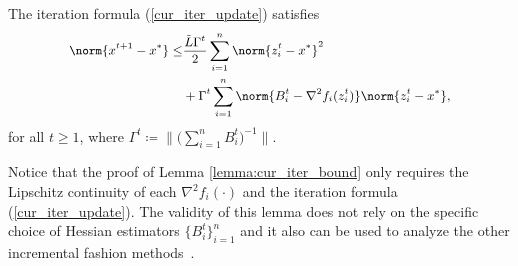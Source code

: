 \begin{lemma}\label{lemma:cur_iter_bound}
    The iteration formula (\ref{cur_iter_update}) satisfies
    \begin{equation}
    \small
    \begin{split}
        \norm{x^{t+1} - x^*} \leq& \frac{\Tilde{L} \Gamma^{t}}{2} \sum_{i=1}^n \norm{z_i^{t} - x^*}^2  \\
        & + \Gamma^{t} \sum_{i=1}^n \norm{B_{i}^{t} - \nabla^2 f_i (z_i^{t})} \norm{z_i^{t} - x^*},
    \end{split}
    \end{equation}
    for all $t \geq 1$, where $\Gamma^t \coloneqq \big\|\big(\sum_{i=1}^n B_i^t\big)^{-1}\big\|$. 
\end{lemma}
\begin{remark}
Notice that the proof of Lemma \ref{lemma:cur_iter_bound} only requires the Lipschitz continuity of each $\nabla^2 f_i(\cdot)$ and the iteration formula (\ref{cur_iter_update}).
The validity of this lemma does not rely on the specific choice of Hessian estimators $\{B_i^t\}_{i=1}^n$ and it also can be used to analyze the other incremental fashion methods~\cite{mokhtari2018iqn,lahoti2023sharpened,gao2020incremental}.
\end{remark}

